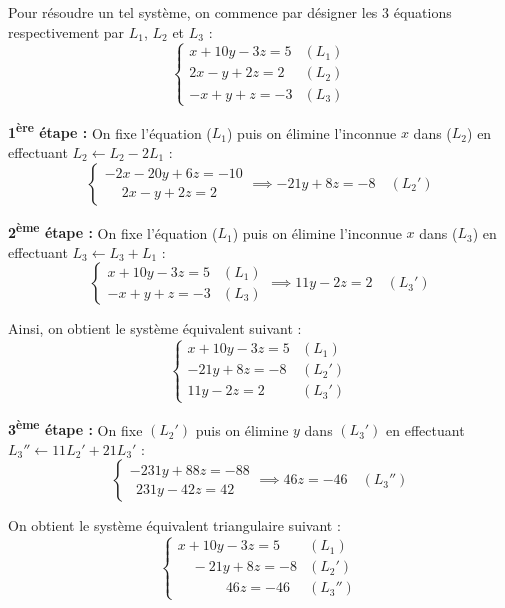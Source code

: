 \documentclass[12pt,a4paper]{article}
\begin{document}
Pour résoudre un tel système, on commence par désigner les 3 équations respectivement par $L_1$, $L_2$ et $L_3$ :
\[
\begin{cases}
x + 10y - 3z = 5 & (L_1) \\
2x - y + 2z = 2 & (L_2) \\
-x + y + z = -3 & (L_3)
\end{cases}
\]

\textbf{1\textsuperscript{ère} étape :} On fixe l'équation ($L_1$) puis on élimine l'inconnue $x$ dans ($L_2$) en effectuant $L_2 \leftarrow L_2 - 2L_1$ :
\[
\begin{cases}
-2x - 20y + 6z = -10 \\
\quad \ 2x - y + 2z = 2
\end{cases}
\implies -21y + 8z = -8 \quad (L_2')
\]

\vspace{0.5cm}

\textbf{2\textsuperscript{ème} étape :} On fixe l'équation ($L_1$) puis on élimine l'inconnue $x$ dans ($L_3$) en effectuant $L_3 \leftarrow L_3 + L_1$ :
\[
\begin{cases}
x + 10y - 3z = 5 & (L_1) \\
-x + y + z = -3 & (L_3)
\end{cases}
\implies 11y - 2z = 2 \quad (L_3')
\]

\vspace{0.5cm}

Ainsi, on obtient le système équivalent suivant :
\[
\begin{cases}
x + 10y - 3z = 5 & (L_1) \\
-21y + 8z = -8 & (L_2') \\
11y - 2z = 2 & (L_3')
\end{cases}
\]

\noindent \textbf{3\textsuperscript{ème} étape :} On fixe $(L_2')$ puis on élimine $y$ dans $(L_3')$ en effectuant $L_3'' \leftarrow 11L_2' + 21L_3'$ :
\[
\begin{cases}
-231y + 88z = -88 \\
\ \ 231y - 42z = 42
\end{cases}
\implies 46z = -46 \quad (L_3'')
\]

On obtient le système équivalent triangulaire suivant :
\[
\begin{cases}
x + 10y - 3z = 5 & (L_1) \\
\quad -21y + 8z = -8 & (L_2') \\
\qquad \quad \ \ 46z = -46 & (L_3'')
\end{cases}
\]
\end{document}
